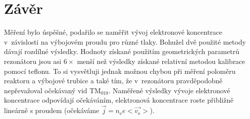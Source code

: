 \documentclass[12pt]{article}
\begin{document}
\section{Závěr}
Měření bylo úspěšné, podařilo se naměřit vývoj elektronové koncentrace v~závislosti na výbojovém proudu pro různé tlaky. Bohužel dvě použité metody dávají rozdílné výsledky. Hodnoty získané použitím geometrických parametrů rezonátoru jsou asi $6\times$ menší než výsledky získané relativní metodou kalibrace pomocí teflonu. To si vysvětluji jednak možnou chybou při měření poloměru reaktoru a výbojové trubice a také tím, že v~rezonátoru pravděpodobně nepřevažoval očekávaný vid TM$_{010}$. Naměřené výsledky vývoje elektronové koncentrace odpovídají očekáváním, elektronová koncentrace roste přibližně lineárně s proudem (očekáváme $\vec{j} = n_\mathrm{e} e <\vec{v_\mathrm{e}}>$).
\end{document}
